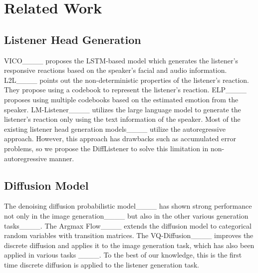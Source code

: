 \section{Related Work}
\subsection{Listener Head Generation}
VICO____ 
proposes the LSTM-based model which generates the listener's responsive reactions based on the speaker's facial and audio information.
L2L____ points out the non-deterministic properties of the listener's reaction. They propose using a codebook to represent the listener's reaction.
ELP____ proposes using multiple codebooks based on the estimated emotion from the speaker.
LM-Listener____ utilizes the large language model to generate the listener's reaction only using the text information of the speaker. 
Most of the existing listener head generation models____ utilize the autoregressive approach. However, this approach has drawbacks such as accumulated error problems, so we propose the DiffListener to solve this limitation in non-autoregressive manner.

\subsection{Diffusion Model}
The denoising diffusion probabilistic model____ has shown strong performance not only in the image generation____
but also in the other various generation tasks____. 
The Argmax Flow____ extends the diffusion model to categorical random variables with transition matrices. 
The VQ-Diffusion____ improves the discrete diffusion and applies it to the image generation task, which has also been applied in various tasks ____. To the best of our knowledge, this is the first time discrete diffusion is applied to the listener generation task.